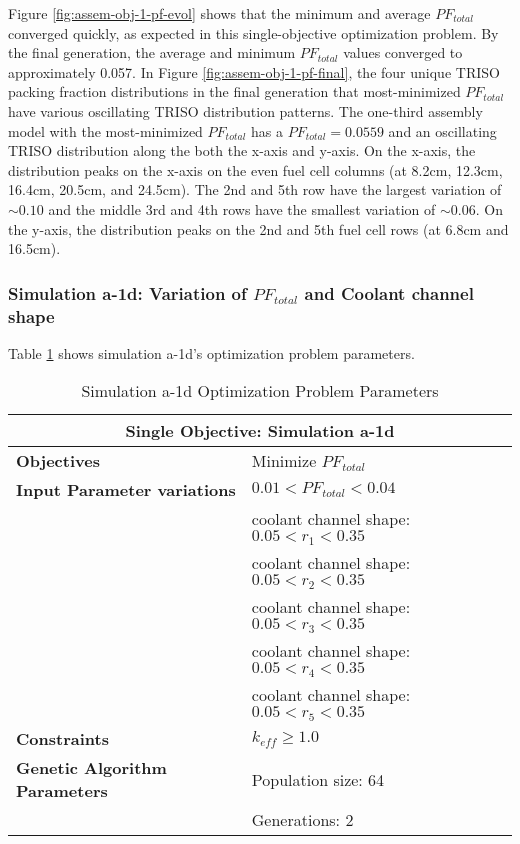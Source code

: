 Figure \ref{fig:assem-obj-1-pf-evol} shows that the minimum and average $PF_{total}$ 
converged quickly, as expected in this single-objective optimization problem.
By the final generation, the average and minimum $PF_{total}$
values converged to approximately 0.057. 
In Figure \ref{fig:assem-obj-1-pf-final}, the four unique TRISO packing fraction 
distributions in the final generation that most-minimized $PF_{total}$ have various 
oscillating TRISO distribution patterns. 
The one-third assembly model with the most-minimized $PF_{total}$ has a 
$PF_{total} =0.0559$ and an oscillating TRISO distribution along the both the 
x-axis and y-axis. 
On the x-axis, the distribution peaks on the x-axis on the even fuel cell columns 
(at 8.2cm, 12.3cm, 16.4cm, 20.5cm, and 24.5cm). 
The 2nd and 5th row have the largest variation of $\sim0.10$ and the middle 3rd and 4th 
rows have the smallest variation of $\sim0.06$.
On the y-axis, the distribution peaks on the 2nd and 5th fuel cell rows (at 6.8cm and 
16.5cm).

\subsubsection{Simulation a-1d: Variation of $PF_{total}$ and Coolant channel shape}
Table \ref{tab:simulationa1d} shows simulation a-1d's optimization problem parameters. 
\begin{table}[htbp!]
    \centering
    \onehalfspacing
    \caption{Simulation a-1d Optimization Problem Parameters}
	\label{tab:simulationa1d}
    \footnotesize
    \begin{tabular}{l|p{6cm}}
    \hline 
    \multicolumn{2}{c}{\textbf{Single Objective: Simulation a-1d}} \\
    \hline 
    \textbf{Objectives} & Minimize $PF_{total}$ \\
    \hline 
    \textbf{Input Parameter variations} & $0.01<PF_{total}<0.04$ \\
    & coolant channel shape: $0.05<r_{1}<0.35$ \\
    & coolant channel shape: $0.05<r_{2}<0.35$ \\
    & coolant channel shape: $0.05<r_{3}<0.35$ \\
    & coolant channel shape: $0.05<r_{4}<0.35$ \\
    & coolant channel shape: $0.05<r_{5}<0.35$ \\
    \hline
    \textbf{Constraints} & $k_{eff} \geq 1.0$\\ 
    \hline 
    \textbf{Genetic Algorithm Parameters} & Population size: 64 \\
    & Generations: 2 \\
    \hline
    \end{tabular}
\end{table}

